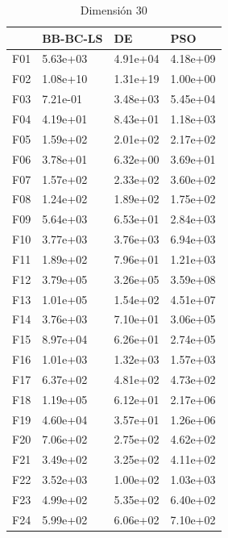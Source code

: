 \begin{table}[H]
\begin{minipage}{.5\linewidth}
    \end{minipage}%
    \begin{minipage}{.5\linewidth}
      \centering
        \caption{Dimensión 30}
        \begin{tabular}{llll}
            \toprule
            {} &  BB-BC-LS &        DE &       PSO \\
            \midrule
            F01  &  5.63e+03 &  4.91e+04 &  4.18e+09 \\
            F02  &  1.08e+10 &  1.31e+19 &  1.00e+00 \\
            F03  &  7.21e-01 &  3.48e+03 &  5.45e+04 \\
            F04  &  4.19e+01 &  8.43e+01 &  1.18e+03 \\
            F05  &  1.59e+02 &  2.01e+02 &  2.17e+02 \\
            F06  &  3.78e+01 &  6.32e+00 &  3.69e+01 \\
            F07  &  1.57e+02 &  2.33e+02 &  3.60e+02 \\
            F08  &  1.24e+02 &  1.89e+02 &  1.75e+02 \\
            F09  &  5.64e+03 &  6.53e+01 &  2.84e+03 \\
            F10  &  3.77e+03 &  3.76e+03 &  6.94e+03 \\
            F11  &  1.89e+02 &  7.96e+01 &  1.21e+03 \\
            F12  &  3.79e+05 &  3.26e+05 &  3.59e+08 \\
            F13  &  1.01e+05 &  1.54e+02 &  4.51e+07 \\
            F14  &  3.76e+03 &  7.10e+01 &  3.06e+05 \\
            F15  &  8.97e+04 &  6.26e+01 &  2.74e+05 \\
            F16  &  1.01e+03 &  1.32e+03 &  1.57e+03 \\
            F17  &  6.37e+02 &  4.81e+02 &  4.73e+02 \\
            F18  &  1.19e+05 &  6.12e+01 &  2.17e+06 \\
            F19  &  4.60e+04 &  3.57e+01 &  1.26e+06 \\
            F20  &  7.06e+02 &  2.75e+02 &  4.62e+02 \\
            F21  &  3.49e+02 &  3.25e+02 &  4.11e+02 \\
            F22  &  3.52e+03 &  1.00e+02 &  1.03e+03 \\
            F23  &  4.99e+02 &  5.35e+02 &  6.40e+02 \\
            F24  &  5.99e+02 &  6.06e+02 &  7.10e+02 \\

\end{tabular}
\end{minipage}
\end{table}
